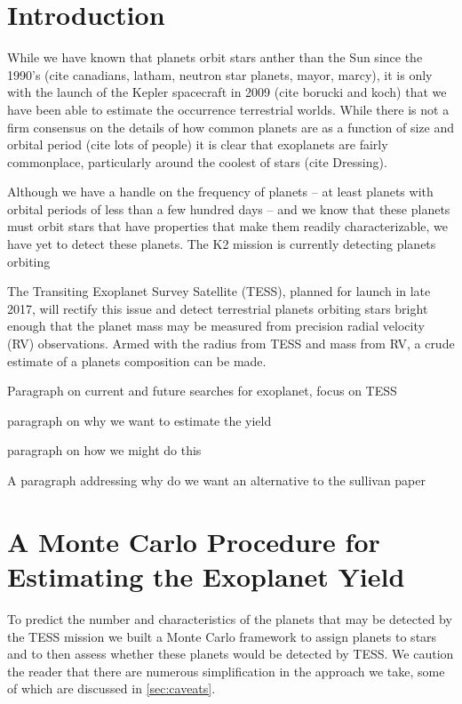 \documentclass[iop,apj]{emulateapj}
\begin{document}
\maketitle

\section{Introduction}
While we have known that planets orbit stars anther than the Sun since the 1990's (cite canadians, latham, neutron star planets, mayor, marcy), it is only with the launch of the Kepler spacecraft in 2009 (cite borucki and koch) that we have been able to estimate the occurrence terrestrial worlds. While there is not a firm consensus on the details of how common planets are as a function of size and orbital period (cite lots of people) it is clear that exoplanets are fairly commonplace, particularly around the coolest of stars (cite Dressing).

Although we have a handle on the frequency of planets -- at least planets with orbital periods of less than a few hundred days -- and we know that these planets must orbit stars that have properties that make them readily characterizable, we have yet to detect these planets. The K2 mission \citep{howell14} is currently detecting planets orbiting 

The Transiting Exoplanet Survey Satellite (TESS), planned for launch in late 2017, will rectify this issue and detect terrestrial planets orbiting stars bright enough that the planet mass may be measured from precision radial velocity (RV) observations. Armed with the radius from TESS and mass from RV, a crude estimate of a planets composition can be made. 

Paragraph on current and future searches for exoplanet, focus on TESS

paragraph on why we want to estimate the yield

paragraph on how we might do this

A paragraph addressing why do we want an alternative to the sullivan paper

\section{A Monte Carlo Procedure for Estimating the Exoplanet Yield}
To predict the number and characteristics of the planets that may be detected by the TESS mission we built a Monte Carlo framework to assign planets to stars and to then assess whether these planets would be detected by TESS. We caution the reader that there are numerous simplification in the approach we take, some of which are discussed in \ref{sec:caveats}.
\end{document}
